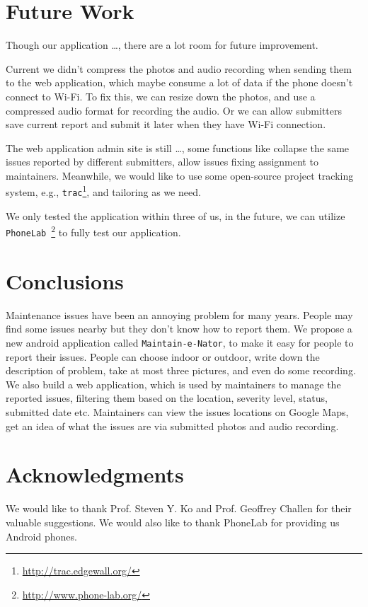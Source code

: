 \documentclass{acm_proc_article-sp}
\begin{document}
\section{Future Work}
Though our application \ldots, there are a lot room for future improvement.
\begin{inparaenum}[(i)]
 \item Current we didn't compress the photos and audio recording when sending them to the web application, which maybe consume a lot of data if the
 phone doesn't connect to Wi-Fi. To fix this, we can resize down the photos, and use a compressed audio format for recording the audio. Or we can allow
 submitters save current report and submit it later when they have Wi-Fi connection.
 \item The web application admin site is still \ldots, some functions like collapse the same issues reported by different submitters, allow issues fixing
 assignment to maintainers. 
 Meanwhile, we would like to use some open-source project tracking system, e.g., \texttt{trac}\footnote{\url{http://trac.edgewall.org/}}, and tailoring as we need.
 \item We only tested the application within three of us, in the future, we can utilize \texttt{PhoneLab}~\footnote{\url{http://www.phone-lab.org/}} to
 fully test our application.
\end{inparaenum}

\section{Conclusions}
Maintenance issues have been an annoying problem for many years. People may find some issues nearby but they don't know how to report them. 
We propose a new android application called \texttt{Maintain-e-Nator}, to make it easy for people to report their issues. People can choose indoor or outdoor, 
write down the description of problem, take at most three pictures, and even do some recording. We also build a web application, 
which is used by maintainers to manage the reported issues, filtering them based on the location, severity level, status, submitted date etc. 
Maintainers can view the issues locations on Google Maps, get an idea of what the issues are via submitted photos and audio recording.

\section{Acknowledgments}
We would like to thank Prof. Steven Y. Ko and Prof. Geoffrey Challen for their valuable suggestions. We would also like to thank 
PhoneLab for providing us Android phones.
\end{document}
